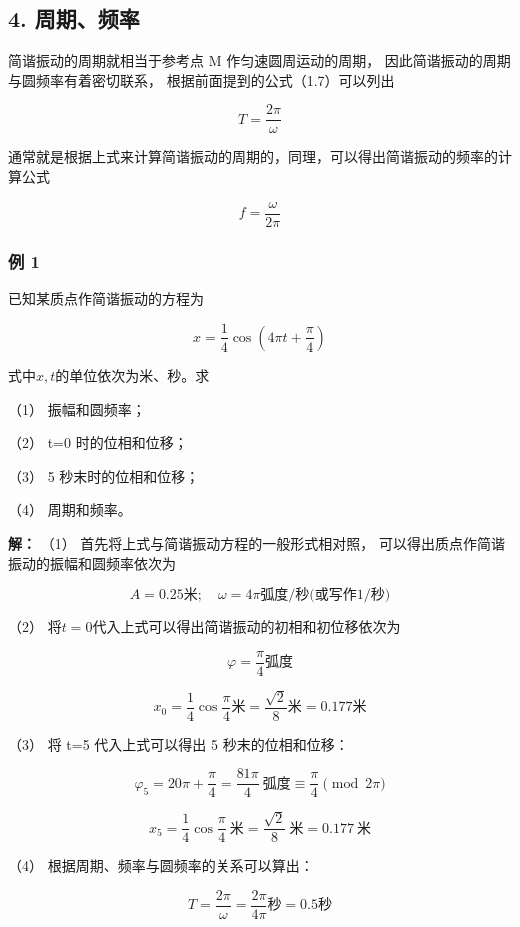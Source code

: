 \subsection{4. 周期、频率}\label{ux5468ux671fux9891ux7387}

简谐振动的周期就相当于参考点 M 作匀速圆周运动的周期，
因此简谐振动的周期与圆频率有着密切联系，
根据前面提到的公式（1.7）可以列出

\[
T = \frac {2 \pi}{\omega} \tag {1.10}
\]

通常就是根据上式来计算简谐振动的周期的，同理，可以得出简谐振动的频率的计算公式

\[
f = \frac{\omega}{2\pi} \tag{1.11}
\]

\subsubsection{例 1}\label{ux4f8b-1}

已知某质点作简谐振动的方程为

\[
x = \frac {1}{4} \cos \left(4 \pi t + \frac {\pi}{4}\right)
\]

式中\(x, t\)的单位依次为米、秒。求

（1） 振幅和圆频率；

（2） t=0 时的位相和位移；

（3） 5 秒末时的位相和位移；

（4） 周期和频率。

\textbf{解：} （1） 首先将上式与简谐振动方程的一般形式相对照，
可以得出质点作简谐振动的振幅和圆频率依次为

\[
A = 0.25 \text{米}; \quad \omega = 4 \pi \text{弧度/秒(或写作1/秒)}
\]

（2） 将\(t = 0\)代入上式可以得出简谐振动的初相和初位移依次为

\[
\varphi = \frac {\pi}{4} \text{弧度}
\]

\[
x _ {0} = \frac {1}{4} \cos \frac {\pi}{4} \text{米} = \frac {\sqrt {2}}{8} \text{米} = 0.177 \text{米}
\]

（3） 将 t=5 代入上式可以得出 5 秒末的位相和位移：

\[
\varphi_5 = 20\pi+\frac{\pi}{4}=\frac{81\pi}{4}\ \text{弧度}\equiv \frac{\pi}{4}\pmod{2\pi}
\]

\[
x_5=\frac14\cos\frac{\pi}{4}\ \text{米}=\frac{\sqrt2}{8}\ \text{米}=0.177\ \text{米}
\]

（4） 根据周期、频率与圆频率的关系可以算出：

\[
T = \frac {2 \pi}{\omega} = \frac {2 \pi}{4 \pi} \text{秒} = 0.5 \text{秒}
\]

